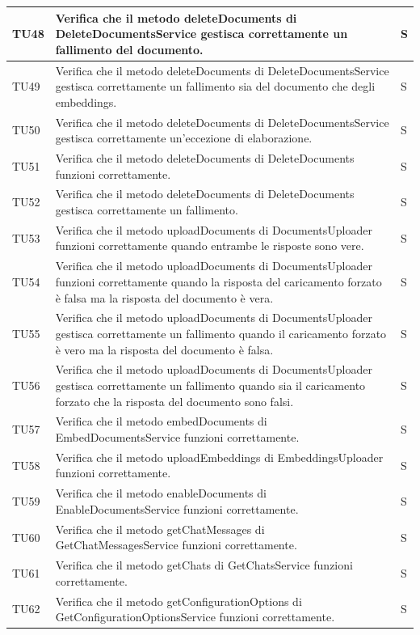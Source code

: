\documentclass[10pt, a4paper]{article}
\begin{document}
\begin{xltabular}{\textwidth}{p{0.12\textwidth}|p{0.7\textwidth}|X}
\hline
TU48 & Verifica che il metodo deleteDocuments di DeleteDocumentsService gestisca correttamente un fallimento del documento. & S \\
\hline
TU49 & Verifica che il metodo deleteDocuments di DeleteDocumentsService gestisca correttamente un fallimento sia del documento che degli embeddings. & S \\
\hline
TU50 & Verifica che il metodo deleteDocuments di DeleteDocumentsService gestisca correttamente un'eccezione di elaborazione. & S \\
\hline
TU51 & Verifica che il metodo deleteDocuments di DeleteDocuments funzioni correttamente. & S \\
\hline
TU52 & Verifica che il metodo deleteDocuments di DeleteDocuments gestisca correttamente un fallimento. & S \\
\hline
TU53 & Verifica che il metodo uploadDocuments di DocumentsUploader funzioni correttamente quando entrambe le risposte sono vere. & S \\
\hline
TU54 & Verifica che il metodo uploadDocuments di DocumentsUploader funzioni correttamente quando la risposta del caricamento forzato è falsa ma la risposta del documento è vera. & S \\
\hline
TU55 & Verifica che il metodo uploadDocuments di DocumentsUploader gestisca correttamente un fallimento quando il caricamento forzato è vero ma la risposta del documento è falsa. & S \\
\hline
TU56 & Verifica che il metodo uploadDocuments di DocumentsUploader gestisca correttamente un fallimento quando sia il caricamento forzato che la risposta del documento sono falsi. & S \\
\hline
TU57 & Verifica che il metodo embedDocuments di EmbedDocumentsService funzioni correttamente. & S \\
\hline
TU58 & Verifica che il metodo uploadEmbeddings di EmbeddingsUploader funzioni correttamente. & S \\
\hline
TU59 & Verifica che il metodo enableDocuments di EnableDocumentsService funzioni correttamente. & S \\
\hline
TU60 & Verifica che il metodo getChatMessages di GetChatMessagesService funzioni correttamente. & S \\
\hline
TU61 & Verifica che il metodo getChats di GetChatsService funzioni correttamente. & S \\
\hline
TU62 & Verifica che il metodo getConfigurationOptions di GetConfigurationOptionsService funzioni correttamente. & S \\

\end{xltabular}
\end{document}
